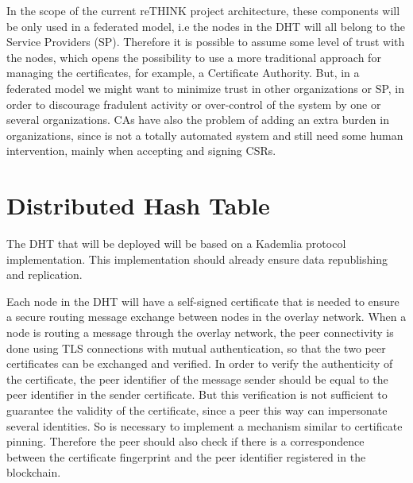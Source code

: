 In the scope of the current reTHINK project architecture, these components will be only used in a federated model, i.e the nodes in the \ac{DHT} will all belong to the Service Providers (SP).
Therefore it is possible to assume some level of trust with the nodes, which opens the possibility to use a more traditional approach for managing the certificates, for example, a Certificate Authority.
But, in a federated model we might want to minimize trust in other organizations or SP, in order to discourage fradulent activity or over-control of the system by one or several organizations.
\acp{CA} have also the problem of adding an extra burden in organizations, since is not a totally automated system and still need some human intervention, mainly when accepting and signing \acp{CSR}.


\section{Distributed Hash Table}\label{ssec:dht}

The DHT that will be deployed will be based on a Kademlia protocol implementation.
This implementation should already ensure data republishing and replication.

Each node in the DHT will have a self-signed certificate that is needed to ensure a secure routing message exchange between nodes in the overlay network.
When a node is routing a message through the overlay network, the peer connectivity is done using TLS connections with mutual authentication, so that the two peer certificates can be exchanged and verified.
In order to verify the authenticity of the certificate, the peer identifier of the message sender should be equal to the peer identifier in the sender certificate.
But this verification is not sufficient to guarantee the validity of the certificate, since a peer this way can impersonate several identities.
So is necessary to implement a mechanism similar to certificate pinning.
Therefore the peer should also check if there is a correspondence between the certificate fingerprint and the peer identifier registered in the blockchain.


